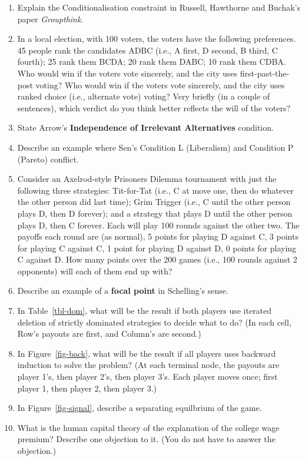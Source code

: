 \documentclass[
  12pt,
  letterpaper,
  DIV=11,
  numbers=noendperiod]{scrartcl}
\providecommand{\tightlist}{%
  \setlength{\itemsep}{0pt}\setlength{\parskip}{0pt}}\usepackage{longtable,booktabs,array}
\begin{document}
\begin{enumerate}
\def\labelenumi{\arabic{enumi}.}
\tightlist
\item
  Explain the Conditionalisation constraint in Russell, Hawthorne and
  Buchak's paper \emph{Groupthink}.
\item
  In a local election, with 100 voters, the voters have the following
  preferences. 45 people rank the candidates ADBC (i.e., A first, D
  second, B third, C fourth); 25 rank them BCDA; 20 rank them DABC; 10
  rank them CDBA. Who would win if the voters vote sincerely, and the
  city uses first-past-the-post voting? Who would win if the voters vote
  sincerely, and the city uses ranked choice (i.e., alternate vote)
  voting? Very briefly (in a couple of sentences), which verdict do you
  think better reflects the will of the voters?
\item
  State Arrow's \textbf{Independence of Irrelevant Alternatives}
  condition.
\item
  Describe an example where Sen's Condition L (Liberalism) and Condition
  P (Pareto) conflict.
\item
  Consider an Axelrod-style Prisoners Dilemma tournament with just the
  following three strategies: Tit-for-Tat (i.e., C at move one, then do
  whatever the other person did last time); Grim Trigger (i.e., C until
  the other person plays D, then D forever); and a strategy that plays D
  until the other person plays D, then C forever. Each will play 100
  rounds against the other two. The payoffs each round are (as normal),
  5 points for playing D against C, 3 points for playing C against C, 1
  point for playing D against D, 0 points for playing C against D. How
  many points over the 200 games (i.e., 100 rounds against 2 opponents)
  will each of them end up with?
\item
  Describe an example of a \textbf{focal point} in Schelling's sense.
\item
  In Table~\ref{tbl-dom}, what will be the result if both players use
  iterated deletion of strictly dominated strategies to decide what to
  do? (In each cell, Row's payouts are first, and Column's are second.)
\item
  In Figure~\ref{fig-back}, what will be the result if all players uses
  backward induction to solve the problem? (At each terminal node, the
  payouts are player 1's, then player 2's, then player 3's. Each player
  moves once; first player 1, then player 2, then player 3.)
\item
  In Figure~\ref{fig-signal}, describe a separating equilbrium of the
  game.
\item
  What is the human capital theory of the explanation of the college
  wage premium? Describe one objection to it. (You do not have to answer
  the objection.)
\end{enumerate}
\end{document}
